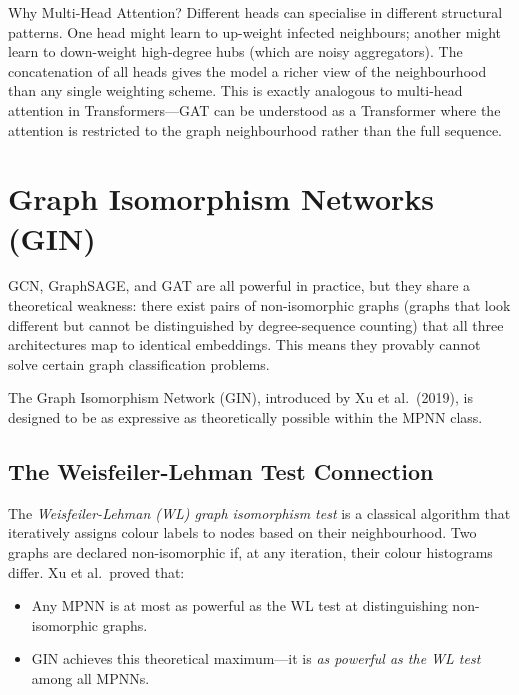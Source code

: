 \begin{keyinsight}{Why Multi-Head Attention?}
Different heads can specialise in different structural patterns. One head might learn to up-weight infected neighbours; another might learn to down-weight high-degree hubs (which are noisy aggregators). The concatenation of all heads gives the model a richer view of the neighbourhood than any single weighting scheme. This is exactly analogous to multi-head attention in Transformers---GAT can be understood as a Transformer where the attention is restricted to the graph neighbourhood rather than the full sequence.
\end{keyinsight}

\section{Graph Isomorphism Networks (GIN)}
\label{sec:gin}

GCN, GraphSAGE, and GAT are all powerful in practice, but they share a theoretical weakness: there exist pairs of non-isomorphic graphs (graphs that look different but cannot be distinguished by degree-sequence counting) that all three architectures map to identical embeddings. This means they provably cannot solve certain graph classification problems.

The Graph Isomorphism Network (GIN), introduced by Xu et al.\ (2019), is designed to be as expressive as theoretically possible within the MPNN class.

\subsection{The Weisfeiler-Lehman Test Connection}

The \emph{Weisfeiler-Lehman (WL) graph isomorphism test} is a classical algorithm that iteratively assigns colour labels to nodes based on their neighbourhood. Two graphs are declared non-isomorphic if, at any iteration, their colour histograms differ. Xu et al.\ proved that:

\begin{itemize}[noitemsep]
    \item Any MPNN is at most as powerful as the WL test at distinguishing non-isomorphic graphs.
    \item GIN achieves this theoretical maximum---it is \emph{as powerful as the WL test} among all MPNNs.
\end{itemize}

